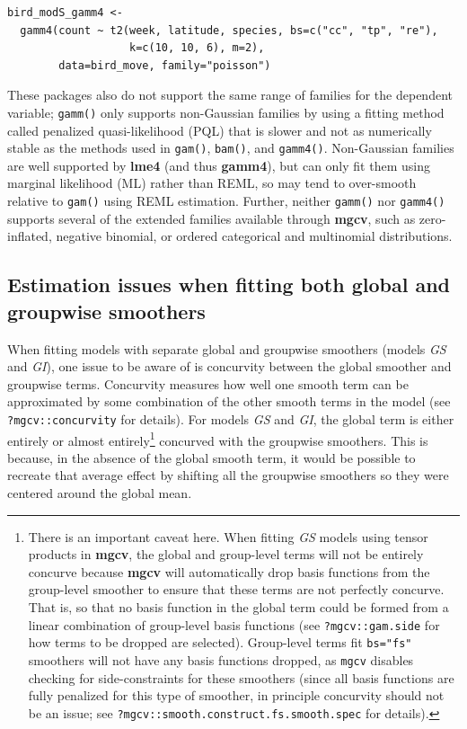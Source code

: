 \documentclass[12pt]{article}
\let\rmarkdownfootnote\footnote%
\def\footnote{\protect\rmarkdownfootnote}
\begin{document}
\begin{verbatim}
bird_modS_gamm4 <-
  gamm4(count ~ t2(week, latitude, species, bs=c("cc", "tp", "re"),
                   k=c(10, 10, 6), m=2),
        data=bird_move, family="poisson")
\end{verbatim}

These packages also do not support the same range of families for the
dependent variable; \texttt{gamm()} only supports non-Gaussian families
by using a fitting method called penalized quasi-likelihood (PQL) that
is slower and not as numerically stable as the methods used in
\texttt{gam()}, \texttt{bam()}, and \texttt{gamm4()}. Non-Gaussian
families are well supported by \textbf{lme4} (and thus \textbf{gamm4}),
but can only fit them using marginal likelihood (ML) rather than REML,
so may tend to over-smooth relative to \texttt{gam()} using REML
estimation. Further, neither \texttt{gamm()} nor \texttt{gamm4()}
supports several of the extended families available through
\textbf{mgcv}, such as zero-inflated, negative binomial, or ordered
categorical and multinomial distributions.

\subsection{Estimation issues when fitting both global and groupwise
smoothers}\label{estimation-issues-when-fitting-both-global-and-groupwise-smoothers}

When fitting models with separate global and groupwise smoothers (models
\emph{GS} and \emph{GI}), one issue to be aware of is concurvity between
the global smoother and groupwise terms. Concurvity measures how well
one smooth term can be approximated by some combination of the other
smooth terms in the model (see \texttt{?mgcv::concurvity} for details).
For models \emph{GS} and \emph{GI}, the global term is either entirely
or almost entirely\footnote{There is an important caveat here. When
  fitting \emph{GS} models using tensor products in \textbf{mgcv}, the
  global and group-level terms will not be entirely concurve because
  \textbf{mgcv} will automatically drop basis functions from the
  group-level smoother to ensure that these terms are not perfectly
  concurve. That is, so that no basis function in the global term could
  be formed from a linear combination of group-level basis functions
  (see \texttt{?mgcv::gam.side} for how terms to be dropped are
  selected). Group-level terms fit \texttt{bs="fs"} smoothers will not
  have any basis functions dropped, as \texttt{mgcv} disables checking
  for side-constraints for these smoothers (since all basis functions
  are fully penalized for this type of smoother, in principle concurvity
  should not be an issue; see
  \texttt{?mgcv::smooth.construct.fs.smooth.spec} for details).}
concurved with the groupwise smoothers. This is because, in the absence
of the global smooth term, it would be possible to recreate that average
effect by shifting all the groupwise smoothers so they were centered
around the global mean.
\end{document}

